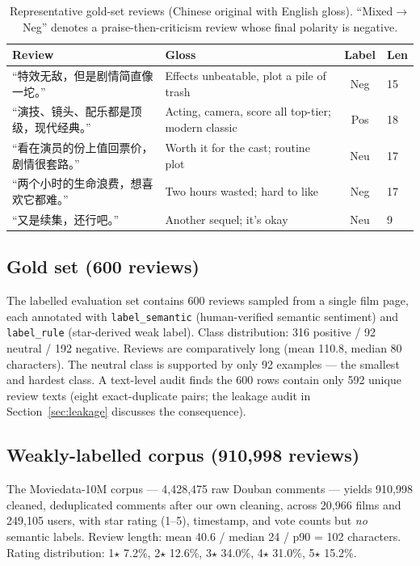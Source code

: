 \documentclass[11pt,a4paper]{article}
\newcommand{\code}[1]{\texttt{#1}}
\begin{document}
\begin{table}[H]
\centering\small
\caption{Representative gold-set reviews (Chinese original with English
gloss). ``Mixed$\to$Neg'' denotes a praise-then-criticism review whose
final polarity is negative.}
\label{tab:examples}
\begin{tabular}{p{5.6cm}p{5.4cm}cl}
\toprule
Review & Gloss & Label & Len \\
\midrule
``特效无敌，但是剧情简直像一坨。'' & Effects unbeatable, plot a
pile of trash & Neg & 15 \\
``演技、镜头、配乐都是顶级，现代经典。'' & Acting, camera, score all
top-tier; modern classic & Pos & 18 \\
``看在演员的份上值回票价，剧情很套路。'' & Worth it for the cast;
routine plot & Neu & 17 \\
``两个小时的生命浪费，想喜欢它都难。'' & Two hours wasted; hard to
like & Neg & 17 \\
``又是续集，还行吧。'' & Another sequel; it's okay & Neu & 9 \\
\bottomrule
\end{tabular}
\end{table}

\subsection{Gold set (600 reviews)}

The labelled evaluation set contains 600 reviews sampled from a single
film page, each annotated with \code{label\_semantic} (human-verified
semantic sentiment) and \code{label\_rule} (star-derived weak label).
Class distribution: 316 positive / 92 neutral / 192 negative.
Reviews are comparatively long (mean 110.8, median 80 characters).
The neutral class is supported by only 92 examples --- the smallest
and hardest class. A text-level audit finds the 600 rows contain only
592 unique review texts (eight exact-duplicate pairs; the leakage
audit in Section~\ref{sec:leakage} discusses the consequence).

\subsection{Weakly-labelled corpus (910{,}998 reviews)}

The Moviedata-10M corpus \citep{douban2024} --- 4{,}428{,}475 raw Douban
comments --- yields 910{,}998 cleaned, deduplicated comments after our own
cleaning, across 20{,}966 films and 249{,}105 users, with
star rating
(1--5), timestamp, and vote counts but \emph{no} semantic labels.
Review length: mean 40.6 / median 24 / p90 = 102 characters. Rating
distribution: 1$\star$ 7.2\%, 2$\star$ 12.6\%, 3$\star$ 34.0\%,
4$\star$ 31.0\%, 5$\star$ 15.2\%.
\end{document}
